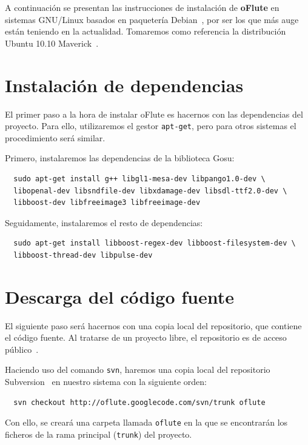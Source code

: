 A continuación se presentan las instrucciones de instalación de \textbf{oFlute}
en sistemas GNU/Linux basados en paquetería Debian~\cite{refdebian}, por
ser los que más auge están teniendo en la actualidad. Tomaremos como referencia
la distribución Ubuntu 10.10 Maverick~\cite{refubuntu}.

\section{Instalación de dependencias}

El primer paso a la hora de instalar oFlute es hacernos con las dependencias del
proyecto. Para ello, utilizaremos el gestor \texttt{apt-get}, pero para otros
sistemas el procedimiento será similar.

Primero, instalaremos las dependencias de la biblioteca Gosu:

\begin{verbatim}
  sudo apt-get install g++ libgl1-mesa-dev libpango1.0-dev \
  libopenal-dev libsndfile-dev libxdamage-dev libsdl-ttf2.0-dev \
  libboost-dev libfreeimage3 libfreeimage-dev
\end{verbatim}

Seguidamente, instalaremos el resto de dependencias:

\begin{verbatim}
  sudo apt-get install libboost-regex-dev libboost-filesystem-dev \ 
  libboost-thread-dev libpulse-dev
\end{verbatim}

\section{Descarga del código fuente}

El siguiente paso será hacernos con una copia local del repositorio, que
contiene el código fuente. Al tratarse de un proyecto libre, el repositorio es
de acceso público~\cite{ofluteforja}.

Haciendo uso del comando \texttt{svn}, haremos una copia local del repositorio
Subversion~\cite{refsubversion} en nuestro sistema con la siguiente orden:

\begin{verbatim}
  svn checkout http://oflute.googlecode.com/svn/trunk oflute
\end{verbatim}

Con ello, se creará una carpeta llamada \texttt{oflute} en la que se encontrarán
los ficheros de la rama principal (\texttt{trunk}) del proyecto.

